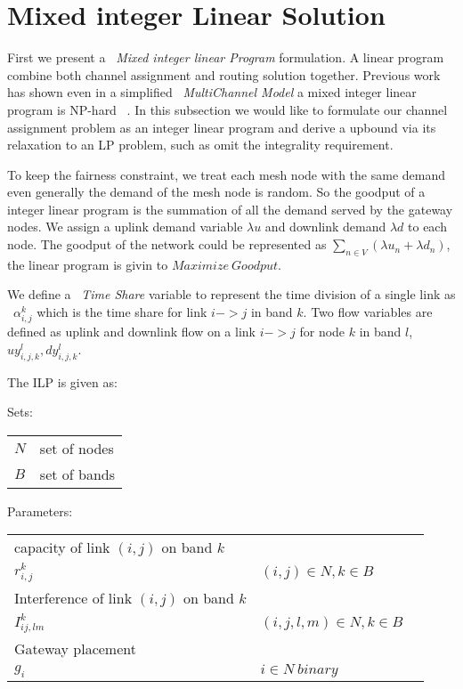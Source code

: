 \section{Mixed integer Linear Solution}
\label{sec:linearopt}

First we present a ~\emph{Mixed integer linear Program} formulation. A linear program combine both channel assignment and routing solution together. 
Previous work has shown even in a simplified ~\emph{MultiChannel Model} a mixed integer linear program is NP-hard ~\cite{marina2010topology}. In this subsection we would like to formulate our channel assignment problem as an integer linear program and derive a upbound via its relaxation to an LP problem, such as omit the integrality requirement.

To keep the fairness constraint, we treat each mesh node with the same demand even generally the demand of the mesh node is random. So the goodput of a integer linear program is the summation of all the demand served by the gateway nodes. We assign a uplink demand variable $\lambda u$ and downlink demand $\lambda d$ to each node. The goodput of the network could be represented as $\sum_{n \in V}(\lambda u_n+ \lambda d_n)$, the linear program is givin to $Maximize\ Goodput$.

We define a ~\emph{Time Share} variable to represent the time division of a single link as ~\emph{$\alpha_{i,j}^k$} which is the time share for link $i->j$ in band $k$. 
Two flow variables are defined as uplink and downlink flow on a link $i->j$ for node $k$ in band $l$, $uy_{i,j,k}^l,dy_{i,j,k}^l$.

\vspace{3pt}
The ILP is given as:

\vspace{2pt}
 Sets:
\vspace{2pt}

\begin{tabular}{ll}
$N$ & set of nodes \\
$B$ & set of bands \\
\end{tabular} 

\vspace{2pt}
Parameters: 
\vspace{1pt}

\begin{tabular}{lll}
capacity of link $(i,j)$ on band $k$ \\
$r_{i,j}^k$ & $(i,j) \in N, k \in B$ & \\
Interference of link $(i,j)$ on band $k$\\
$I_{ij,lm}^k$ & $(i,j,l,m) \in N, k \in B $ & \\
Gateway placement\\
$g_i$ & $i \in N\ binary$ &
\end{tabular}\\

